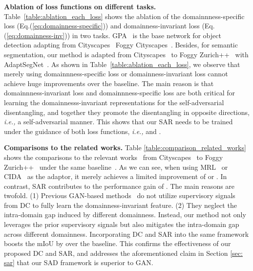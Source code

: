 \documentclass[10pt,journal,compsoc]{IEEEtran}
\begin{document}
\begin{table}[t]
\caption{
Comparison to related works on the baseline~\cite{AdaptSegNet}. 
}

\centering
{}
\end{table}


\noindent \textbf{Ablation of loss functions on different tasks.} 
Table~\ref{table:ablation_each_loss}  shows the ablation of the domainnness-specific loss  (Eq.(\ref{eq:domainness-specific})) and domainness-invariant loss  (Eq.(\ref{eq:domainness-inv})) in two tasks. 
GPA~\cite{GPA} is the base network for object detection adapting from Cityscapes~\cite{cordts2016cityscapes}   Foggy Cityscapes~\cite{FoggyCity}. Besides, for semantic segmentation, our method is adapted from  Cityscapes~\cite{cordts2016cityscapes} to Foggy Zurich++~\cite{FoggyCity,FoggyDriving} with AdaptSegNet~\cite{AdaptSegNet}. 
As shown in Table~\ref{table:ablation_each_loss}, we observe that merely using domainnness-specific loss  or domainness-invariant loss  cannot achieve huge improvements over the baseline. The main reason is that domainnness-invariant loss  and domainnness-specific loss  are both critical for learning the domainnesss-invariant representations for the self-adversarial disentangling, and together they promote the disentangling in opposite directions, \emph{i.e.,} a self-adversarial manner. 
This shows that our SAR needs to be trained under the guidance of both loss functions,  \emph{i.e.,}  and . 


\noindent \textbf{Comparisons to the related works.}
Table \ref{table:comparison_related_works} shows the comparisons to the relevant works~\cite{DDMRL, CIDA} from Cityscapes~\cite{cordts2016cityscapes} to Foggy Zurich++~\cite{FoggyCity,FoggyDriving} under the same baseline~\cite{AdaptSegNet}.
As we can see, when using MRL~\cite{DDMRL} or CIDA~\cite{CIDA} as the adaptor, it merely achieves a limited improvement of  or . In contrast, SAR  contributes to the performance gain of . 
The main reasons are twofold. (1) Previous GAN-based methods~\cite{DDMRL, CIDA} do not utilize supervisory signals  from DC to fully learn the domainness-invariant feature. (2) They neglect the intra-domain gap induced by different domainness. Instead, our method not only leverages the prior supervisory signals but also mitigates the intra-domain gap across different domainness. Incorporating DC and SAR into the same framework boosts the mIoU by  over the baseline. This confirms the effectiveness of our proposed DC and SAR, and addresses the aforementioned claim in Section \ref{sec: sar} that our SAD framework is superior to GAN.
\end{document}
